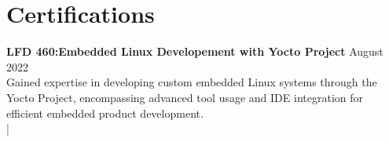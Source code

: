 \documentclass[letter,12pt]{article}
\begin{document}
\pagebreak
\section*{Certifications}
\vspace{-.25cm}
\textbf{LFD 460:Embedded Linux Developement with Yocto
Project} \hfill August 2022\\ 
Gained expertise in developing custom embedded Linux systems through the Yocto Project, encompassing advanced tool usage and IDE integration for efficient embedded product development.\\
\href{https://www.credly.com/badges/2a1ad89a-9c46-4145-a715-128f7a8fd1db/public_url}
{} |
\href{https://ti-user-certificates.s3.amazonaws.com/e0df7fbf-a057-42af-8a1f-590912be5460/fcc7abec-e782-4b52-a893-697157cb2e3b-dylan-garza-9cd517ca-cff3-4ee2-898e-4173cb45d893-certificate.pdf}
{}

\vspace{-.5cm}

\end{document}

